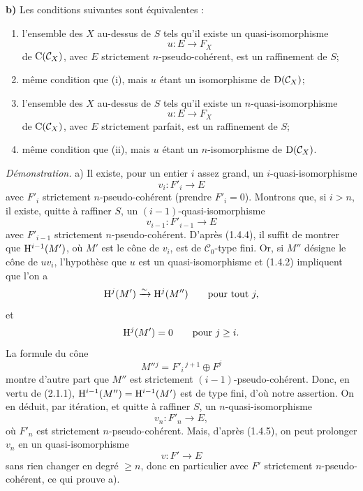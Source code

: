 \documentclass[11pt]{article}
\begin{document}
\textbf{b)} Les conditions suivantes sont équivalentes :
\begin{enumerate}[label=(\roman*)]
\item l'ensemble des \(X\) au-dessus de \(S\) tels qu'il existe un quasi-isomorphisme
\[
  u:E\longrightarrow F_X
\]
de \(\mathrm C(\mathcal C_X)\), avec \(E\) strictement \(n\)-pseudo-cohérent, est un raffinement de \(S\);
\item[\((\mathrm{i}')\)] même condition que (i), mais \(u\) étant un isomorphisme de \(\mathrm D(\mathcal C_X)\);
\item l'ensemble des \(X\) au-dessus de \(S\) tels qu'il existe un \(n\)-quasi-isomorphisme
\[
  u:E\longrightarrow F_X
\]
de \(\mathrm C(\mathcal C_X)\), avec \(E\) strictement parfait, est un raffinement de \(S\);
\item[\((\mathrm{ii}')\)] même condition que (ii), mais \(u\) étant un \(n\)-isomorphisme de \(\mathrm D(\mathcal C_X)\).
\end{enumerate}

\emph{Démonstration.} a) Il existe, pour un entier \(i\) assez grand, un \(i\)-quasi-isomorphisme
\[
  v_i:F'_i\longrightarrow E
\]
avec \(F'_i\) strictement \(n\)-pseudo-cohérent (prendre \(F'_i=0\)). Montrons que, si \(i>n\), il existe, quitte à raffiner \(S\), un \((i-1)\)-quasi-isomorphisme
\[
  v_{i-1}:F'_{i-1}\longrightarrow E
\]
avec \(F'_{i-1}\) strictement \(n\)-pseudo-cohérent. D'après (1.4.4), il suffit de montrer que \(\mathrm H^{i-1}(M')\), où \(M'\) est le cône de \(v_i\), est de \(\mathcal C_0\)-type fini. Or, si \(M''\) désigne le cône de \(uv_i\), l'hypothèse que \(u\) est un quasi-isomorphisme et (1.4.2) impliquent que l'on a
\[
  \mathrm H^j(M')\xrightarrow{\sim} \mathrm H^j(M'')\qquad\text{pour tout }j,
\]
et
\[
  \mathrm H^j(M')=0\qquad\text{pour }j\geq i.
\]
La formule du cône
\[
  M''{}^j=F'_i{}^{\,j+1}\oplus F^j
\]
montre d'autre part que \(M''\) est strictement \((i-1)\)-pseudo-cohérent. Donc, en vertu de (2.1.1), \(\mathrm H^{i-1}(M'')=\mathrm H^{i-1}(M')\) est de type fini, d'où notre assertion. On en déduit, par itération, et quitte à raffiner \(S\), un \(n\)-quasi-isomorphisme
\[
  v_n:F'_n\longrightarrow E,
\]
où \(F'_n\) est strictement \(n\)-pseudo-cohérent. Mais, d'après (1.4.5), on peut prolonger \(v_n\) en un quasi-isomorphisme
\[
  v:F'\longrightarrow E
\]
sans rien changer en degré \(\geq n\), donc en particulier avec \(F'\) strictement \(n\)-pseudo-cohérent, ce qui prouve a).
\end{document}
